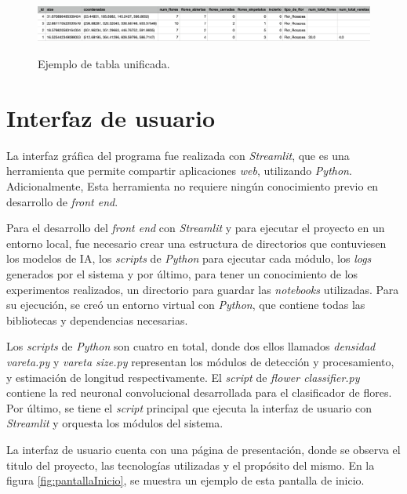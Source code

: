 \begin{figure}[ht]
	\centering
	\includegraphics[width= 14cm, height= 2cm]{./Figures/Tabla3.png}
	\caption{Ejemplo de tabla unificada.}
	\label{fig:TablaResultados3}
\end{figure}

\newpage
\section{Interfaz de usuario}

La interfaz gráfica del programa fue realizada con \textit{Streamlit}, que es una herramienta que permite compartir aplicaciones \textit{web}, utilizando \textit{Python}. Adicionalmente, Esta herramienta no requiere ningún conocimiento previo en desarrollo de \textit{front end}. 

Para el desarrollo del \textit{front end} con \textit{Streamlit} y para ejecutar el proyecto en un entorno local, fue necesario crear una estructura de directorios que contuviesen los modelos de IA, los \textit{scripts} de \textit{Python} para ejecutar cada módulo, los \textit{logs} generados por el sistema y por último, para tener un conocimiento de los experimentos realizados, un directorio para guardar las \textit{notebooks} utilizadas. Para su ejecución, se creó un entorno virtual con \textit{Python}, que contiene todas las bibliotecas y dependencias necesarias.

Los \textit{scripts} de \textit{Python} son cuatro en total, donde dos ellos llamados \textit{densidad vareta.py} y \textit{vareta size.py} representan los módulos de detección y procesamiento, y estimación de longitud respectivamente. El \textit{script} de \textit{flower classifier.py} contiene la red neuronal convolucional desarrollada para el clasificador de flores. Por último, se tiene el \textit{script} principal que ejecuta la interfaz de usuario con \textit{Streamlit} y orquesta los módulos del sistema.

La interfaz de usuario cuenta con una página de presentación, donde se observa el titulo del proyecto, las tecnologías utilizadas y el propósito del mismo. En la figura \ref{fig:pantallaInicio}, se muestra un ejemplo de esta pantalla de inicio.

